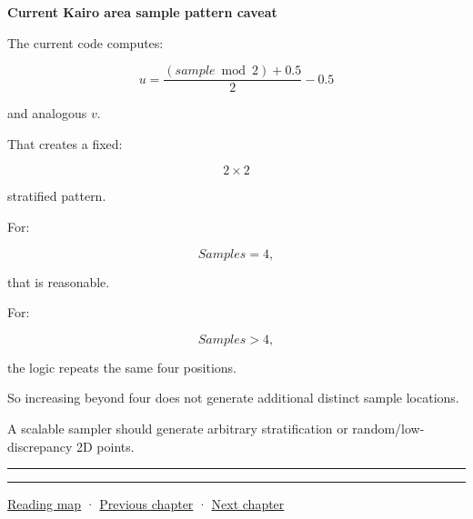 \textbf{Current Kairo area sample pattern caveat}

The current code computes:

\[
u=
\frac{
(sample\bmod2)+0.5
}{2}
-0.5
\]

and analogous \(v\).

That creates a fixed:

\[
2\times2
\]

stratified pattern.

For:

\[
Samples=4,
\]

that is reasonable.

For:

\[
Samples>4,
\]

the  logic repeats the same four positions.

So increasing  beyond four does not generate additional distinct sample locations.

A scalable sampler should generate arbitrary stratification or random/low-discrepancy 2D points.

\begin{center}\rule{0.5\linewidth}{0.5pt}\end{center}

\begin{center}\rule{0.5\linewidth}{0.5pt}\end{center}

\hyperref[volume-reading-map]{Reading map} · \hyperref[03-visual-computing-i-ch007-the-rendering-equation-and-path-probabilities]{Previous chapter} · \hyperref[03-visual-computing-i-ch009-point-lights-mis-and-environment-lighting]{Next chapter}
